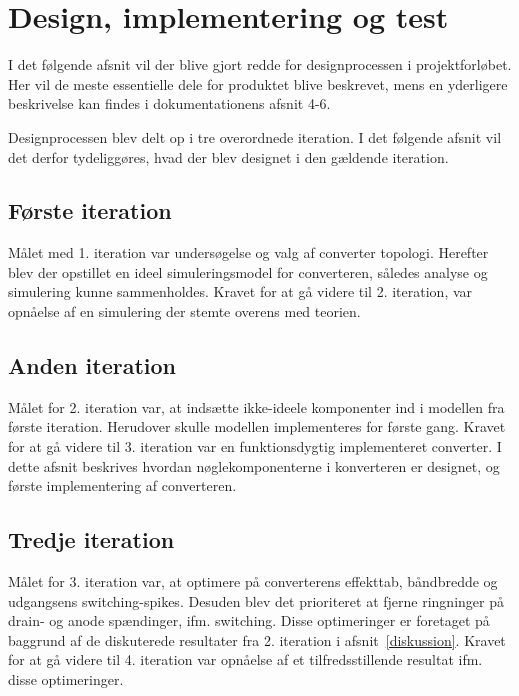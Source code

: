 \chapter{Design, implementering og test}
I det følgende afsnit vil der blive gjort redde for designprocessen i projektforløbet. Her vil de meste essentielle dele for produktet blive beskrevet, mens en yderligere beskrivelse kan findes i dokumentationens afsnit 4-6.

Designprocessen blev delt op i tre overordnede iteration. I det følgende afsnit vil det derfor tydeliggøres, hvad der blev designet i den gældende iteration. 


\section{Første iteration}
Målet med 1. iteration var undersøgelse og valg af converter topologi. Herefter blev der opstillet en ideel simuleringsmodel for converteren, således analyse og simulering kunne sammenholdes. 
Kravet for at gå videre til 2. iteration, var opnåelse af en simulering der stemte overens med teorien. 






\section{Anden iteration}
Målet for 2. iteration var, at indsætte ikke-ideele komponenter ind i modellen fra første iteration. Herudover skulle modellen implementeres for første gang. 
Kravet for at gå videre til 3. iteration var en funktionsdygtig implementeret converter. 
I dette afsnit beskrives hvordan nøglekomponenterne i konverteren er designet, og første implementering af converteren.














\clearpage

\section{Tredje iteration}
Målet for 3. iteration var, at optimere på converterens effekttab, båndbredde og udgangsens switching-spikes. Desuden blev det prioriteret at fjerne ringninger på drain- og anode spændinger, ifm. switching. Disse optimeringer er foretaget på baggrund af de diskuterede resultater fra 2. iteration i afsnit~\ref{diskussion}.
Kravet for at gå videre til 4. iteration var opnåelse af et tilfredsstillende resultat ifm. disse optimeringer.

